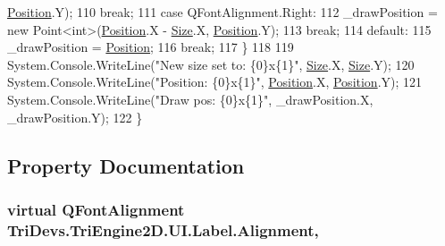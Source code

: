 \begin{DoxyCode}
      \hyperlink{class_tri_devs_1_1_tri_engine2_d_1_1_u_i_1_1_label_adc1aa6af6f6ba7e66611ae9be5a1033b}{Position}.Y);
110                     \textcolor{keywordflow}{break};
111                 \textcolor{keywordflow}{case} QFontAlignment.Right:
112                     \_drawPosition = \textcolor{keyword}{new} Point<int>(\hyperlink{class_tri_devs_1_1_tri_engine2_d_1_1_u_i_1_1_label_adc1aa6af6f6ba7e66611ae9be5a1033b}{Position}.X - \hyperlink{class_tri_devs_1_1_tri_engine2_d_1_1_u_i_1_1_control_a9f162a69e4a170ed284cf13b0eaa655f}{Size}.X, 
      \hyperlink{class_tri_devs_1_1_tri_engine2_d_1_1_u_i_1_1_label_adc1aa6af6f6ba7e66611ae9be5a1033b}{Position}.Y);
113                     \textcolor{keywordflow}{break};
114                 \textcolor{keywordflow}{default}:
115                     \_drawPosition = \hyperlink{class_tri_devs_1_1_tri_engine2_d_1_1_u_i_1_1_label_adc1aa6af6f6ba7e66611ae9be5a1033b}{Position};
116                     \textcolor{keywordflow}{break};
117             \}
118 
119             System.Console.WriteLine(\textcolor{stringliteral}{"New size set to: \{0\}x\{1\}"}, \hyperlink{class_tri_devs_1_1_tri_engine2_d_1_1_u_i_1_1_control_a9f162a69e4a170ed284cf13b0eaa655f}{Size}.X, 
      \hyperlink{class_tri_devs_1_1_tri_engine2_d_1_1_u_i_1_1_control_a9f162a69e4a170ed284cf13b0eaa655f}{Size}.Y);
120             System.Console.WriteLine(\textcolor{stringliteral}{"Position: \{0\}x\{1\}"}, \hyperlink{class_tri_devs_1_1_tri_engine2_d_1_1_u_i_1_1_label_adc1aa6af6f6ba7e66611ae9be5a1033b}{Position}.X, 
      \hyperlink{class_tri_devs_1_1_tri_engine2_d_1_1_u_i_1_1_label_adc1aa6af6f6ba7e66611ae9be5a1033b}{Position}.Y);
121             System.Console.WriteLine(\textcolor{stringliteral}{"Draw pos: \{0\}x\{1\}"}, \_drawPosition.X, \_drawPosition.Y);
122         \}
\end{DoxyCode}


\subsection{Property Documentation}
\hypertarget{class_tri_devs_1_1_tri_engine2_d_1_1_u_i_1_1_label_a9070b8e7fd4e88683c44b1d3348753dc}{
\subsubsection[{Alignment}]{\setlength{\rightskip}{0pt plus 5cm}virtual Q\-Font\-Alignment Tri\-Devs.\-Tri\-Engine2\-D.\-U\-I.\-Label.\-Alignment\hspace{0.3cm}{\ttfamily [get]}, {\ttfamily [set]}}}\label{class_tri_devs_1_1_tri_engine2_d_1_1_u_i_1_1_label_a9070b8e7fd4e88683c44b1d3348753dc}


